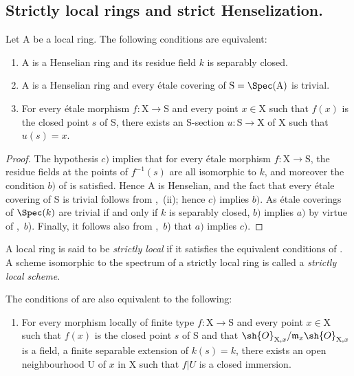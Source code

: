 \subsection{Strictly local rings and strict Henselization.}
\label{subsection:IV.18.8}


\begin{proposition}[18.8.1]
\label{IV.18.8.1}
Let $\mathrm{A}$ be a local ring.
The following conditions are equivalent:
\begin{enumerate}[label=\emph{\alph*)}]
  \item A is a Henselian ring and its residue field $k$ is separably closed.
  \item A is a Henselian ring and every \'{e}tale covering of $\mathrm{S}=\Spec(\mathrm{A})$ is trivial.
  \item For every \'{e}tale morphism $f:\mathrm{X}\to\mathrm{S}$ and every point $x\in\mathrm{X}$ such that $f(x)$ is the closed point $s$ of S, there exists an S-section $u:\mathrm{S}\to\mathrm{X}$ of X such that $u(s)=x$.
\end{enumerate}
\end{proposition}

\begin{proof}
The hypothesis $c)$ implies that for every \'{e}tale morphism $f:\mathrm{X}\to\mathrm{S}$, the residue fields at the points of $f^{-1}(s)$ are all isomorphic to $k$, and moreover the condition $b)$ of  is satisfied.
Hence A is Henselian, and the fact that every \'{e}tale covering of S is trivial follows from ,~(ii);
hence $c)$ implies $b)$.
As \'{e}tale coverings of $\Spec(k)$ are trivial if and only if $k$ is separably closed, $b)$ implies $a)$ by virtue of ,~$b$).
Finally, it follows also from ,~$b$) that $a)$ implies $c)$.
\end{proof}

\begin{definition}[18.8.2]
\label{IV.18.8.2}
A local ring is said to be \emph{strictly local} if it satisfies the equivalent conditions of .
A scheme isomorphic to the spectrum of a strictly local ring is called a \emph{strictly local scheme}.
\end{definition}

\begin{remark}[18.8.3]
\label{IV.18.8.3}
The conditions of  are also equivalent to the following:
\begin{enumerate}
  \item[d)] For every morphism locally of finite type $f:\mathrm{X}\to\mathrm{S}$ and every point $x\in\mathrm{X}$ such that $f(x)$ is the closed point $s$ of S and that $\sh{O}_{\mathrm{X},x}/\mathfrak{m}_x\sh{O}_{\mathrm{X},x}$ is a field, a finite separable extension of $k(s)=k$, there exists an open neighbourhood U of $x$ in X such that $f|U$ is a closed immersion.
\end{enumerate}
\end{remark}

